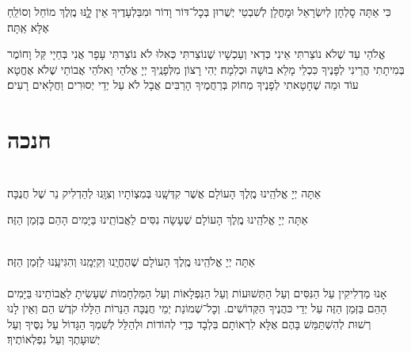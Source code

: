 \documentclass[twoside, openany, parskip=half, 11pt]{book}
\begin{document}
כִּי אַתָּה סׇלְחָן לְיִשְׂרָאֵל וּמׇחֳלָן לְשִׁבְטֵי יְשֻׁרוּן בְּכׇל־דּוֹר וָדוֹר
וּמִבַּלְעָדֶיךָ אֵין לׇׇֽנּוּ מֶֽלֶךְ מוֹחֵל וְסוֹלֵֽחַ אֶלָּא אַֽתָּה׃

אֱלֹהַי עַד שֶׁלֹא נוֹצַרתִּי אֵינִי כְּדַאי וְעַכְשָׁיו שֶׁנוֹצַרתִּי כְּאִלוּ לֹא נוֹצַרתִּי עָפָר אֲנִי בְּחַיָי קַּל וָחוֹמֶר בְּמִיתָתִי הֲרֵינִי לְפָּנֶיךָ כִּכְלֵי מָלֵא בוּשָׁה וּכְלִמָה׃ יְהִי רָצוֹן מִלְּפָנֶֽיךָ יְיָ אֱלֹהַי וֵאלֹהֵי אֲבוֹתַי שֶׁלֹא אֶחֱטָא עוֹד וּמַה שֶׁחָטָאתִי לְפָנֶיךָ מְחוֹק בְּרַחֲמֶיךָ הָרַבִּים אֲבָל לֹא עַל יְדֵי יְסוּרִים וַחֲלָאִים רָעִים׃

\vfill
\sepline

\chapter[חנכה]{ חנכה }
\label{chanukah}

\\
אַתָּה יְיָ אֱלֹהֵֽינוּ מֶֽלֶךְ הָעוֹלָם
אֲשֶׁר קִדְּשָֽׁנוּ בְּמִצְוֹתָיו וְצִוָּֽנוּ לְהַדְלִיק נֵר שֶׁל חֲנֻכָּה׃

אַתָּה יְיָ אֱלֹהֵֽינוּ מֶֽלֶךְ הָעוֹלָם שֶׁעָשָׂה נִסִּים לַאֲבוֹתֵֽינוּ בַּיָּמִים הָהֵם בַּזְּמַן הַזֶּה׃

\\
אַתָּה יְיָ אֱלֹהֵֽינוּ מֶֽלֶךְ הָעוֹלָם שֶׁהֶחֱיָֽנוּ וְקִיְּמָֽנוּ וְהִגִּיעָֽנוּ לַזְּמַן הַזֶּה׃\\

\\
אָנוּ מַדְלִיקִין
עַל הַנִּסִּים וְעַל הַתְּשׁוּעוֹת
וְעַל הַנִּפְלָאוֹת
וְעַל הַמִּלְחָמוֹת
שֶׁעָשִׂיתָ לַאֲבוֹתֵינוּ
בַּיָּמִים הָהֵם בַּזְּמַן הַזֶּה
עַל יְדֵי כּהֲנֶיךָ הַקְּדוֹשִׁים.
וְכׇל־שְׁמוֹנַת יְמֵי חֲנֻכָּה
הַנֵּרוֹת הַלָּלוּ קֹדֶשׁ הֵם
וְאֵין לָנוּ רְשׁוּת לְהִשְׁתַּמֵּשׁ בָּהֶם
אֶלָּא לִרְאוֹתָם בִּלְבָד
כְּדֵי לְהוֹדוֹת וּלְהַלֵּל לְשִׁמְךָ הַגָּדוֹל
עַל נִסֶּיךָ וְעַל יְשׁוּעָתֶךָ
וְעַל נִפְלְאוֹתֶיךָ׃
\end{document}
